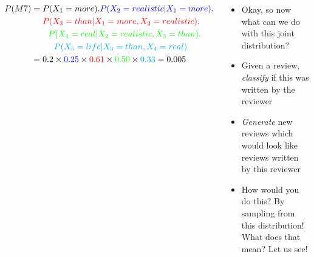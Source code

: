 \begin{frame}
\begin{columns}
\begin{overlayarea}{\textwidth}{\textheight}
			\visible<3->
			{
				\small
				\begin{align*}
					P(M7) &= \color{black}P(X_1=more).\color{blue}P(X_2=realistic|X_1=more).\\
					         &~~~~\color{red}P(X_3=than|X_1=more,X_2=realistic).\\
					         &~~~~~~\color{green}P(X_4=real|X_2=realistic,X_3=than).\\
					         &~~~~~~~~\color{cyan}P(X_5=life|X_3=than,X_4=real)\\
					      &= 0.2 \times \color{blue} 0.25 \color{black} \times \color{red}0.61 \color{black}\times \color{green}0.50 \color{black}\times \color{cyan}0.33 \color{black}= 0.005
				\end{align*}
			}
		\end{overlayarea}

		\begin{overlayarea}{\textwidth}{\textheight}
			\begin{itemize}\justifying
				\item<1-> Okay, so now what can we do with this joint distribution?
				\item<2-> Given a review, \textit{classify} if this was written by the reviewer 
				\item<4-> \textit{Generate} new reviews which would look like reviews written by this reviewer 
				\item<5-> How would you do this? By sampling from this distribution! What does that mean? Let us see!
			\end{itemize}
		\end{overlayarea}
	\end{columns}
\end{frame}


